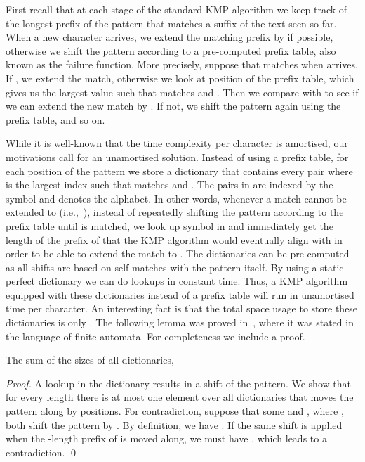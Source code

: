 \documentclass[envcountsame]{llncs}
\begin{document}
First recall that at each stage of the standard KMP algorithm we keep track of the longest prefix of the pattern that matches a suffix of the text seen so far. When a new character  arrives, we extend the matching prefix by  if possible, otherwise we shift the pattern according to a pre-computed prefix table, also known as the failure function. More precisely, suppose that  matches  when  arrives. If , we extend the match, otherwise we look at position  of the prefix table, which gives us the largest value  such that  matches  and . Then we compare  with  to see if we can extend the new match by . If not, we shift the pattern again using the prefix table, and so on.

While it is well-known that the time complexity per
character is  amortised, our motivations call for an unamortised
solution. Instead of using a prefix table, for each position  of the pattern we store a dictionary  that contains every pair  where  is the largest index such that  matches  and .
The pairs  in  are indexed by the symbol  and  denotes the alphabet.
In other words, whenever a match  cannot be extended to  (i.e.,~), instead of repeatedly shifting the pattern according to the prefix table until  is matched, we look up symbol  in  and immediately get the length  of the prefix of  that the KMP algorithm would eventually align with  in order to be able to extend the match to . The dictionaries  can be pre-computed as all shifts are based on self-matches with the pattern itself. By using a static perfect dictionary we can do lookups in constant time. Thus, a KMP algorithm equipped with
these dictionaries instead of a prefix table will run in unamortised  time per character.
An interesting fact is that the total space usage to store these dictionaries is only . The following lemma was proved in~\cite{Simon:1993}, where it was stated in the language of finite automata. For completeness we include a proof.

\begin{lemma}
    \label{lem:shifts}
    The sum of the sizes of all dictionaries, 
\end{lemma}
\begin{proof}
    A lookup in the dictionary  results in a shift of the pattern. We show that for every length  there is at most one element over all dictionaries that moves the pattern along by  positions. For contradiction, suppose that some  and , where , both shift the pattern by . By definition, we have . If the same shift  is applied when the -length prefix of  is moved along, we must have , which leads to a contradiction.
    \qed
\end{proof}
\end{document}
